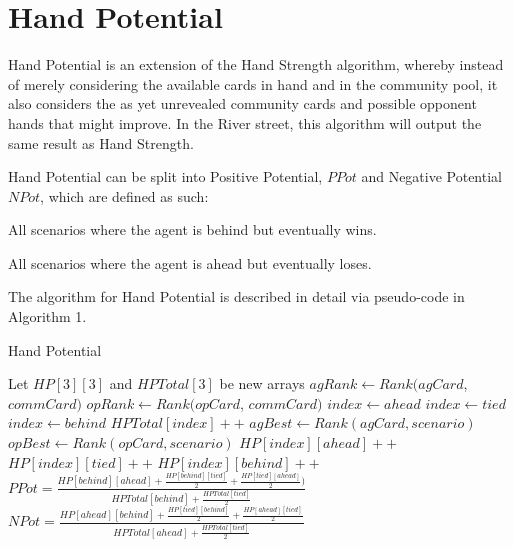 \documentclass{article}
\begin{document}
\iffalse
\section{Hand Potential}

Hand Potential is an extension of the Hand Strength algorithm, whereby instead of merely considering the available cards in hand and in the community pool, it also considers the as yet unrevealed community cards and possible opponent hands that might improve. In the River street, this algorithm will output the same result as Hand Strength.

Hand Potential can be split into Positive Potential, $PPot$ and Negative Potential $NPot$, which are defined as such:
\begin{description}[style=multiline,leftmargin=10mm]
\item [\emph{PPot}]All scenarios where the agent is behind but eventually wins.
\item [\emph{NPot}]All scenarios where the agent is ahead but eventually loses.
\end{description}

The algorithm for Hand Potential is described in detail via pseudo-code in Algorithm 1.

  \begin{algorithm}
   \caption{Hand Potential}
    \begin{algorithmic}[1]
        \State Let $HP[3][3]$ and $HPTotal[3]$ be new arrays
        \State $agRank \leftarrow Rank(agCard$, $commCard)$
            \State $opRank \leftarrow Rank(opCard$, $commCard)$
              \State $index \leftarrow ahead$
              \State $index \leftarrow tied$
            \Else
              \State $index \leftarrow behind$
            \EndIf
            \State $HPTotal[index]++$
              \State $agBest \leftarrow Rank(agCard, scenario)$
              \State $opBest \leftarrow Rank(opCard, scenario)$
                \State $HP[index][ahead]++$
                \State $HP[index][tied]++$
              \Else
                \State $HP[index][behind]++$
              \EndIf
            \EndFor
        \EndFor
        \State $PPot=\frac{HP[behind][ahead] + \frac{HP[behind][tied]}{2} +
  \frac{HP[tied][ahead]}{2})}{HPTotal[behind]+\frac{HPTotal[tied]}{2}}$
		\State $NPot = \frac{HP[ahead][behind] + \frac{HP[tied][behind]}{2} + \frac{HP[ahead][tied]}{2}}{HPTotal[ahead]+\frac{HPTotal[tied]}{2}}$
        \State{}
      \EndFunction
    \end{algorithmic}
  \end{algorithm}
\end{document}
